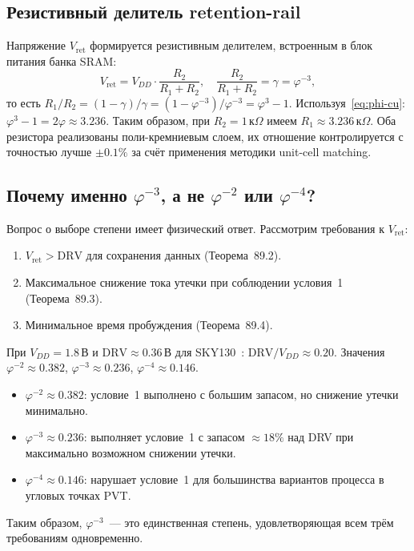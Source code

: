\subsection{Резистивный делитель retention-rail}

Напряжение $V_\mathrm{ret}$ формируется резистивным делителем,
встроенным в блок питания банка SRAM:
%
\begin{equation}
  V_\mathrm{ret} = V_{DD} \cdot \frac{R_2}{R_1 + R_2},
  \quad
  \frac{R_2}{R_1 + R_2} = \gamma = \varphi^{-3},
  \label{eq:divider}
\end{equation}
%
то есть $R_1/R_2 = (1-\gamma)/\gamma = (1 - \varphi^{-3})/\varphi^{-3} = \varphi^3 - 1$.
Используя~\eqref{eq:phi-cu}: $\varphi^3 - 1 = 2\varphi \approx 3.236$.
Таким образом, при $R_2 = 1\,\text{к}\Omega$ имеем $R_1 \approx 3.236\,\text{к}\Omega$.
Оба резистора реализованы поли-кремниевым слоем,
их отношение контролируется с точностью лучше $\pm0.1\%$
за счёт применения методики unit-cell matching.

\subsection{Почему именно $\varphi^{-3}$, а не $\varphi^{-2}$ или $\varphi^{-4}$?}

Вопрос о выборе степени имеет физический ответ.
Рассмотрим требования к $V_\mathrm{ret}$:
\begin{enumerate}
  \item $V_\mathrm{ret} > \mathrm{DRV}$ для сохранения данных (Теорема~89.2).
  \item Максимальное снижение тока утечки при соблюдении условия~1
        (Теорема~89.3).
  \item Минимальное время пробуждения (Теорема~89.4).
\end{enumerate}
При $V_{DD} = 1.8\,\text{В}$ и $\mathrm{DRV} \approx 0.36\,\text{В}$
для SKY130~\cite{SKY130-PDK}:
$\mathrm{DRV}/V_{DD} \approx 0.20$.
Значения $\varphi^{-2} \approx 0.382$, $\varphi^{-3} \approx 0.236$,
$\varphi^{-4} \approx 0.146$.
\begin{itemize}
  \item $\varphi^{-2} \approx 0.382$: условие~1 выполнено
        с большим запасом, но снижение утечки минимально.
  \item $\varphi^{-3} \approx 0.236$: выполняет условие~1
        с запасом $\approx 18\%$ над DRV
        при максимально возможном снижении утечки.
  \item $\varphi^{-4} \approx 0.146$: нарушает условие~1
        для большинства вариантов процесса в угловых точках PVT.
\end{itemize}
Таким образом, $\varphi^{-3}$~--- это единственная степень,
удовлетворяющая всем трём требованиям одновременно.


